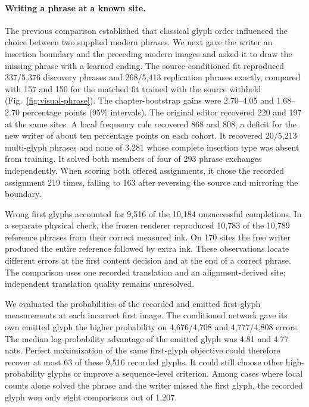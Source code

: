 \documentclass[12pt,a4paper]{article}
\providecommand{\DIFadd}[1]{{\protect\color{blue} \sf #1}} %
\begin{document}
\paragraph{\DIFadd{Writing a phrase at a known site.}}
\DIFadd{The previous comparison established that classical glyph order influenced the choice between two supplied modern phrases. We next gave the writer an insertion boundary and the preceding modern images and asked it to draw the missing phrase with a learned ending. The source-conditioned fit reproduced 337/5,376 discovery phrases and 268/5,413 replication phrases exactly, compared with 157 and 150 for the matched fit trained with the source withheld (Fig.~\ref{fig:visual-phrase}). The chapter-bootstrap gains were 2.70--4.05 and 1.68--2.70 percentage points (95\% intervals). The original editor recovered 220 and 197 at the same sites. A local frequency rule recovered 868 and 808, a deficit for the new writer of about ten percentage points on each cohort. It recovered 20/5,213 multi-glyph phrases and none of 3,281 whose complete insertion type was absent from training. It solved both members of four of 293 phrase exchanges independently. When scoring both offered assignments, it chose the recorded assignment 219 times, falling to 163 after reversing the source and mirroring the boundary.
}

\DIFadd{Wrong first glyphs accounted for 9,516 of the 10,184 unsuccessful completions. In a separate physical check, the frozen renderer reproduced 10,783 of the 10,789 reference phrases from their correct measured ink. On 170 sites the free writer produced the entire reference followed by extra ink. These observations locate different errors at the first content decision and at the end of a correct phrase. The comparison uses one recorded translation and an alignment-derived site; independent translation quality remains unresolved.
}

\DIFadd{We evaluated the probabilities of the recorded and emitted first-glyph measurements at each incorrect first image. The conditioned network gave its own emitted glyph the higher probability on 4,676/4,708 and 4,777/4,808 errors. The median log-probability advantage of the emitted glyph was 4.81 and 4.77 nats. Perfect maximization of the same first-glyph objective could therefore recover at most 63 of these 9,516 recorded glyphs. It could still choose other high-probability glyphs or improve a sequence-level criterion. Among cases where local counts alone solved the phrase and the writer missed the first glyph, the recorded glyph won only eight comparisons out of 1,207.
}
\end{document}
